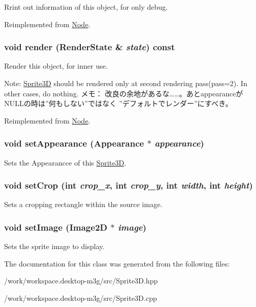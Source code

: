 Rrint out information of this object, for only debug. 

Reimplemented from \hyperlink{classm3g_1_1Node_6fea17fa1532df3794f8cb39cb4f911f}{Node}.\hypertarget{classm3g_1_1Sprite3D_8babc8a79b78615da51161e94029eea9}{
\subsubsection[{render}]{\setlength{\rightskip}{0pt plus 5cm}void render ({\bf RenderState} \& {\em state}) const}}
\label{classm3g_1_1Sprite3D_8babc8a79b78615da51161e94029eea9}


Render this object, for inner use.

Note: \hyperlink{classm3g_1_1Sprite3D}{Sprite3D} should be rendered only at second rendering pass(pass=2). In other cases, do nothing. メモ： 改良の余地があるな……。あとappearanceがNULLの時は”何もしない”ではなく ”デフォルトでレンダー”にすべき。 

Reimplemented from \hyperlink{classm3g_1_1Node_8babc8a79b78615da51161e94029eea9}{Node}.\hypertarget{classm3g_1_1Sprite3D_b9b44bad4241635062ed66437c9bae48}{
\subsubsection[{setAppearance}]{\setlength{\rightskip}{0pt plus 5cm}void setAppearance ({\bf Appearance} $\ast$ {\em appearance})}}
\label{classm3g_1_1Sprite3D_b9b44bad4241635062ed66437c9bae48}


Sets the Appearancce of this \hyperlink{classm3g_1_1Sprite3D}{Sprite3D}. \hypertarget{classm3g_1_1Sprite3D_35ca6d3ff64f2232a0f3a11bf4ab483e}{
\subsubsection[{setCrop}]{\setlength{\rightskip}{0pt plus 5cm}void setCrop (int {\em crop\_\-x}, \/  int {\em crop\_\-y}, \/  int {\em width}, \/  int {\em height})}}
\label{classm3g_1_1Sprite3D_35ca6d3ff64f2232a0f3a11bf4ab483e}


Sets a cropping rectangle within the source image. \hypertarget{classm3g_1_1Sprite3D_705b89b41cd1b38f664ed912be44baaa}{
\subsubsection[{setImage}]{\setlength{\rightskip}{0pt plus 5cm}void setImage ({\bf Image2D} $\ast$ {\em image})}}
\label{classm3g_1_1Sprite3D_705b89b41cd1b38f664ed912be44baaa}


Sets the sprite image to display. 

The documentation for this class was generated from the following files:\begin{CompactItemize}
\item 
/work/workspace.desktop-m3g/src/Sprite3D.hpp\item 
/work/workspace.desktop-m3g/src/Sprite3D.cpp\end{CompactItemize}
